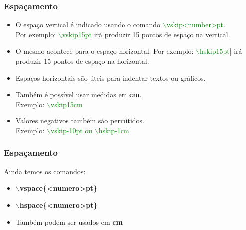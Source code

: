 
\begin{frame}[fragile]
  \frametitle{Espaçamento}

  \begin{itemize}[<+->]
     \item O espaço vertical é indicado usando o comando \textcolor{green}{$\backslash$vskip<number>pt}. \\
           Por exemplo: \textcolor{green}{$\backslash$vskip15pt} irá produzir 15 pontos de espaço na vertical.
     \item O mesmo acontece para o espaço horizontal:
           Por exemplo: \textcolor{green}{$\backslash$hskip15pt}| irá produzir 15 pontos de espaço na horizontal.
     \item Espaços horizontais são úteis para indentar textos ou gráficos.
     \item Também é possível usar medidas em \textbf{cm}. \\
           Exemplo: \textcolor{green}{$\backslash$vskip15cm}
     \item Valores negativos também sào permitidos.\\
           Exemplo: \textcolor{green}{$\backslash$vskip-10pt ou $\backslash$hskip-1cm}
  \end{itemize}

\end{frame}


\begin{frame}
  \frametitle{Espaçamento}
  Ainda temos os comandos:
  \begin{itemize}[<+->]
     \item \textbf{$\backslash$vspace\{<numero>pt\}}
     \item \textbf{$\backslash$hspace\{<numero>pt\}}
     \item Também podem ser usados em \textbf{cm}
  \end{itemize}

\end{frame}

